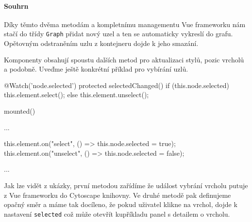 \paragraph{Souhrn} Díky těmto dvěma metodám a kompletnímu managementu Vue frameworku nám stačí do třídy \texttt{Graph} přidat nový uzel a ten se automaticky vykreslí do grafu. Opětovným odstraněním uzlu z kontejneru dojde k jeho smazání.

\medskip

Komponenty obsahují spoustu dalších metod pro aktualizaci stylů, pozic vrcholů a podobně. Uveďme ještě konkrétní příklad pro vybírání uzlů.
\begin{code}
@Watch('node.selected')
protected selectedChanged() {
    if (this.node.selected) {
        this.element.select();
    } else {
        this.element.unselect();
    }
}

mounted() {
    ...

    this.element.on("select", () => this.node.selected = true);
    this.element.on("unselect", () => this.node.selected = false);

    ...
}
\end{code}

Jak lze vidět z ukázky, první metodou zařídíme že událost vybrání vrcholu putuje z Vue frameworku do Cytoscape knihovny. Ve druhé metodě pak definujeme opačný směr a máme tak docíleno, že pokud uživatel klikne na vrchol, dojde k nastavení \texttt{selected} což může otevřít kupříkladu panel s detailem o vrcholu.